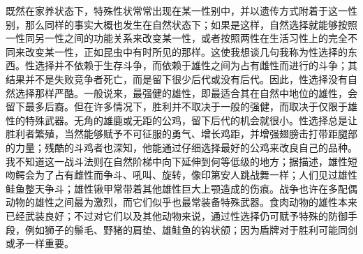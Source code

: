 {既然在家养状态下，特殊性状常常出现在某一性别中，并以遗传方式附着于这一性别，那么同样的事实大概也发生在自然状态下；如果是这样，自然选择就能够按照一性同另一性之间的功能关系来改变某一性，或者按照两性在生活习性上的完全不同来改变某一性，正如昆虫中有时所见的那样。这使我想谈几句我称为性选择的东西。性选择并不依赖于生存斗争，而依赖于雄性之间为占有雌性而进行的斗争；其结果并不是失败竞争者死亡，而是留下很少后代或没有后代。因此，性选择没有自然选择那样严酷。一般说来，最强健的雄性，即最适合其在自然中地位的雄性，会留下最多后裔。但在许多情况下，胜利并不取决于一般的强健，而取决于仅限于雄性的特殊武器。无角的雄鹿或无距的公鸡，留下后代的机会就很小。性选择总是让胜利者繁殖，当然能够赋予不可征服的勇气、增长鸡距，并增强翅膀击打带距腿部的力量；残酷的斗鸡者也深知，他能通过仔细选择最好的公鸡来改良自己的品种。我不知道这一战斗法则在自然阶梯中向下延伸到何等低级的地方；据描述，雄性短吻鳄会为了占有雌性而争斗、吼叫、旋转，像印第安人跳战舞一样；人们见过雄性鲑鱼整天争斗；雄性锹甲常带着其他雄性巨大上颚造成的伤痕。战争也许在多配偶动物的雄性之间最为激烈，而它们似乎也最常装备特殊武器。食肉动物的雄性本来已经武装良好；不过对它们以及其他动物来说，通过性选择仍可赋予特殊的防御手段，例如狮子的鬃毛、野猪的肩垫、雄鲑鱼的钩状颌；因为盾牌对于胜利可能同剑或矛一样重要。}

